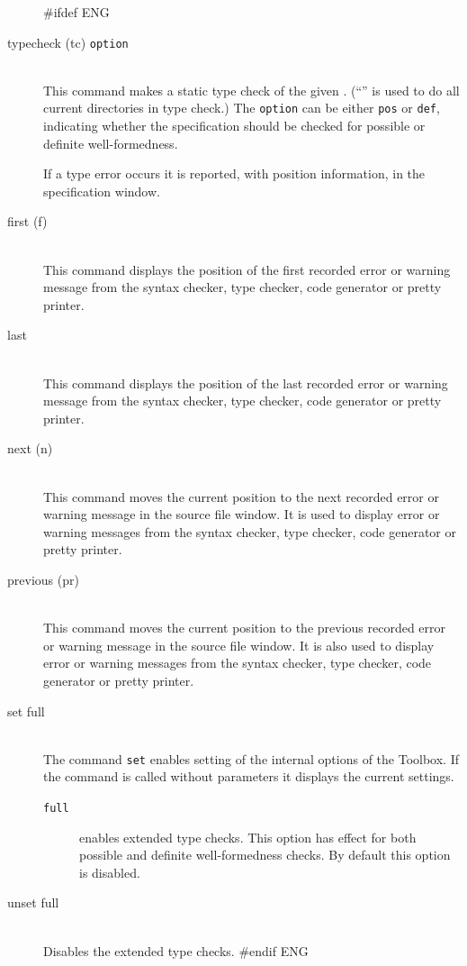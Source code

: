 \documentclass[\pformat,12pt]{article}
\newcommand{\Toolbox}{Toolbox}
\newcommand{\Toolbox}{Toolbox}
\begin{document}
\begin{description}  
#ifdef ENG
\item[typecheck (tc) \ifthenelse{\boolean{VDMsl}}{{[}{\tt
      module}{]}}{{\tt class}} {\tt option}]\mbox{}\\ 
  This command makes a static type check of the given
  .
  (``{\tt *}'' is used to do  all current directories in type check.)
  The {\tt option} can be either {\tt pos} or {\tt def}, indicating whether the
  specification should be checked for possible or definite
  well-formedness.

  If a type error occurs it is reported, with position
  information, in the specification window.

\item[first (f)] \mbox{}\\
  This command displays the position of the first recorded error or
  warning message from the syntax checker, type checker, code
  generator or pretty printer.

\item[last] \mbox{}\\
  This command displays the position of the last recorded error or
  warning message from the syntax checker, type checker, code
  generator or pretty printer.

\item[next (n) \index{next command}]\mbox{}\\
  This command moves the current position to the next recorded error
  or warning message in the source file window.  It is used to
  display error or warning messages from the syntax checker, type
  checker, code generator or pretty printer.

\item[previous (pr)] \mbox{}\\
  This command moves the current position to the previous recorded
  error or warning message in the source file window. It is also used to
  display error or warning messages from the syntax checker, type
  checker, code generator or pretty printer.

\item[set full]\mbox{}\\
  The command {\tt set} enables setting of the internal options of the
  \Toolbox.  If the command is called without parameters it displays
  the current settings.
  \begin{description}
    \item[{\tt full}] enables extended type checks. This option has
      effect for both possible and definite well-formedness checks. By
      default this option is disabled.
  \end{description}
\item[unset full]\mbox{}\\
  Disables the extended type checks.
#endif ENG


\end{description}
\end{document}

